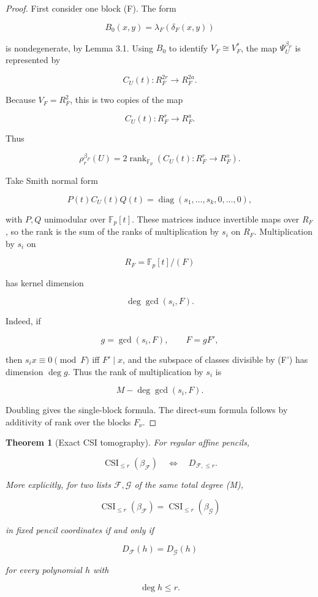 \documentclass[11pt]{article}
\newtheorem{theorem}{Theorem}[section]
\begin{document}
\begin{proof}
First consider one block (F). The form

\[
B_0(x,y)=\lambda_F(\delta_F(x,y))
\]

is nondegenerate, by Lemma 3.1. Using $B_0$ to identify $V_F\cong V_F^*$, the map $\Psi_U^{\beta_F}$ is represented by

\[
C_U(t):R_F^{2r}\to R_F^{2a}.
\]

Because $V_F=R_F^2$, this is two copies of the map

\[
C_U(t):R_F^r\to R_F^a.
\]

Thus

\[
\rho_r^{\beta_F}(U)
=2\operatorname{rank}_{\mathbb F_p}
\left(
C_U(t):R_F^r\to R_F^a
\right).
\tag{6.3}
\]

Take Smith normal form

\[
P(t)C_U(t)Q(t)
=\operatorname{diag}(s_1,\ldots,s_k,0,\ldots,0),
\]

with $P,Q$ unimodular over $\mathbb F_p[t]$. These matrices induce invertible maps over $R_F$, so the rank is the sum of the ranks of multiplication by $s_i$ on $R_F$. Multiplication by $s_i$ on

\[
R_F=\mathbb F_p[t]/(F)
\]

has kernel dimension

\[
\deg\gcd(s_i,F).
\]

Indeed, if

\[
g=\gcd(s_i,F),
\qquad
F=gF',
\]

then $s_ix\equiv0\pmod F$ iff $F'\mid x$, and the subspace of classes divisible by (F') has dimension $\deg g$. Thus the rank of multiplication by $s_i$ is

\[
M-\deg\gcd(s_i,F).
\]

Doubling gives the single-block formula. The direct-sum formula follows by additivity of rank over the blocks $F_\nu$.

\end{proof}

\begin{theorem}[Exact CSI tomography]
For regular affine pencils,

\[
\boxed{
\operatorname{CSI}_{\le r}(\beta_{\mathcal F})
\quad\Longleftrightarrow\quad
D_{\mathcal F,\le r}.
}
\]

More explicitly, for two lists $\mathcal F,\mathcal G$ of the same total degree (M),

\[
\operatorname{CSI}_{\le r}(\beta_{\mathcal F})
=
\operatorname{CSI}_{\le r}(\beta_{\mathcal G})
\]

in fixed pencil coordinates if and only if

\[
D_{\mathcal F}(h)=D_{\mathcal G}(h)
\]

for every polynomial $h$ with

\[
\deg h\le r.
\]

\end{theorem}
\end{document}

